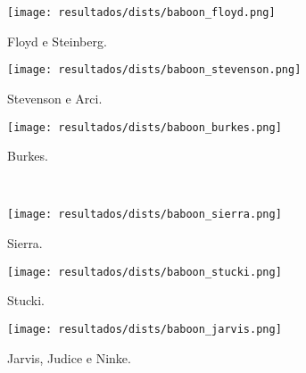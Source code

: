 \begin{subfigure}{0.33\textwidth}
    \centering
    \texttt{[image: resultados/dists/baboon\_floyd.png]}
    \caption{Floyd e Steinberg.}
    \label{fig:baboon:floyd}
\end{subfigure}%
\begin{subfigure}{0.33\textwidth}
    \centering
    \texttt{[image: resultados/dists/baboon\_stevenson.png]}
    \caption{Stevenson e Arci.}
    \label{fig:baboon:stevenson}
\end{subfigure}%
\begin{subfigure}{0.33\textwidth}
    \centering
    \texttt{[image: resultados/dists/baboon\_burkes.png]}
    \caption{Burkes.}
    \label{fig:baboon:burkes}
\end{subfigure}\\[8pt]
\begin{subfigure}{0.33\textwidth}
    \centering
    \texttt{[image: resultados/dists/baboon\_sierra.png]}
    \caption{Sierra.}
    \label{fig:baboon:sierra}
\end{subfigure}%
\begin{subfigure}{0.33\textwidth}
    \centering
    \texttt{[image: resultados/dists/baboon\_stucki.png]}
    \caption{Stucki.}
    \label{fig:baboon:stucki}
\end{subfigure}%
\begin{subfigure}{0.33\textwidth}
    \centering
    \texttt{[image: resultados/dists/baboon\_jarvis.png]}
    \caption{Jarvis, Judice e Ninke.}
    \label{fig:baboon:jarvis}
\end{subfigure}